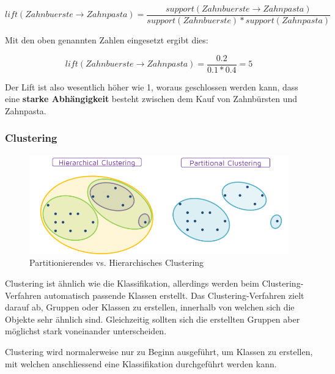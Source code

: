\documentclass[a4paper, 11pt, nofootinbib]{article}
\begin{document}
\begin{equation}
lift(Zahnbuerste \rightarrow Zahnpasta) = \dfrac{support({Zahnbuerste \rightarrow Zahnpasta})}{support(Zahnbuerste) * support(Zahnpasta)}
\end{equation}

Mit den oben genannten Zahlen eingesetzt ergibt dies:

\begin{equation}
	lift(Zahnbuerste \rightarrow Zahnpasta) = \dfrac{0.2}{0.1 * 0.4} = 5
\end{equation}

Der Lift ist also wesentlich höher wie 1, woraus geschlossen werden kann, dass eine \textbf{starke Abhängigkeit} besteht zwischen dem Kauf von Zahnbürsten und Zahnpasta.
 
 \newpage
 
 \subsubsection{Clustering}
 
  \begin{figure}[htb]
 	\centering
 	\includegraphics[keepaspectratio=true,height=12\baselineskip]{clustering.png}
 	\caption{Partitionierendes vs. Hierarchisches Clustering}
 	\label{fig:Clustering}
 \end{figure}
 
 Clustering ist ähnlich wie die Klassifikation, allerdings werden beim Clustering-Verfahren automatisch passende Klassen erstellt. Das Clustering-Verfahren zielt darauf ab, Gruppen oder Klassen zu erstellen, innerhalb von welchen sich die Objekte sehr ähnlich sind. Gleichzeitig sollten sich die erstellten Gruppen aber möglichst stark voneinander unterscheiden.
 
 Clustering wird normalerweise nur zu Beginn ausgeführt, um Klassen zu erstellen, mit welchen anschliessend eine Klassifikation durchgeführt werden kann.
 
 \vspace{10px}
 
\end{document}
